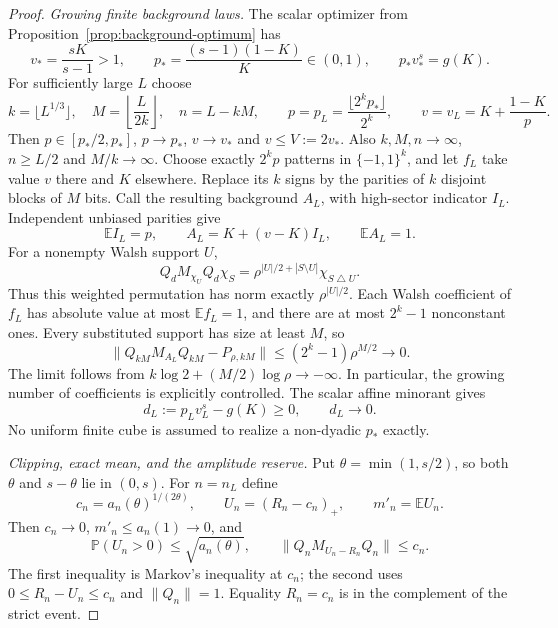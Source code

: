 \documentclass[11pt]{article}
\begin{document}
\begin{proof}
\emph{Growing finite background laws.}
The scalar optimizer from Proposition~\ref{prop:background-optimum} has
\[
 v_*=\frac{sK}{s-1}>1,\qquad
 p_*=\frac{(s-1)(1-K)}K\in(0,1),\qquad p_*v_*^s=g(K).
\]
For sufficiently large $L$ choose
\[
 k=\lfloor L^{1/3}\rfloor,\quad
 M=\left\lfloor\frac{L}{2k}\right\rfloor,\quad n=L-kM,
 \qquad p=p_L=\frac{\lfloor2^kp_*\rfloor}{2^k},
 \qquad v=v_L=K+\frac{1-K}{p}.
\]
Then $p\in[p_*/2,p_*]$, $p\to p_*$, $v\to v_*$ and
$v\le V:=2v_*$. Also $k,M,n\to\infty$, $n\ge L/2$ and
$M/k\to\infty$. Choose exactly $2^kp$ patterns in $\{-1,1\}^k$,
and let $f_L$ take value $v$ there and $K$ elsewhere.
Replace its $k$ signs by the parities of $k$ disjoint blocks of $M$
bits. Call the resulting background $A_L$, with high-sector indicator
$I_L$. Independent unbiased parities give
\[
 \mathbb EI_L=p,\qquad A_L=K+(v-K)I_L,\qquad\mathbb EA_L=1.
\]
For a nonempty Walsh support $U$,
\[
 Q_dM_{\chi_U}Q_d\chi_S
 =\rho^{|U|/2+|S\setminus U|}\chi_{S\mathbin\triangle U}.
\]
Thus this weighted permutation has norm exactly $\rho^{|U|/2}$.
Each Walsh coefficient of $f_L$ has absolute value at most
$\mathbb E f_L=1$, and there are at most $2^k-1$ nonconstant ones.
Every substituted support has size at least $M$, so
\begin{equation}\label{eq:attained-parity}
 \|Q_{kM}M_{A_L}Q_{kM}-P_{\rho,kM}\|
 \le(2^k-1)\rho^{M/2}\longrightarrow0.
\end{equation}
The limit follows from $k\log2+(M/2)\log\rho\to-\infty$.
In particular, the growing number of coefficients is explicitly
controlled. The scalar affine minorant gives
\begin{equation}\label{eq:attained-dyadic-excess}
 d_L:=p_Lv_L^s-g(K)\ge0,\qquad d_L\to0.
\end{equation}
No uniform finite cube is assumed to realize a non-dyadic $p_*$ exactly.

\emph{Clipping, exact mean, and the amplitude reserve.}
Put $\theta=\min(1,s/2)$, so both $\theta$ and $s-\theta$ lie in $(0,s)$.
For $n=n_L$ define
\[
 c_n=a_n(\theta)^{1/(2\theta)},\qquad
 U_n=(R_n-c_n)_+,\qquad m'_n=\mathbb EU_n.
\]
Then $c_n\to0$, $m'_n\le a_n(1)\to0$, and
\begin{equation}\label{eq:attained-clipping}
 \mathbb P(U_n>0)\le\sqrt{a_n(\theta)},\qquad
 \|Q_nM_{U_n-R_n}Q_n\|\le c_n.
\end{equation}
The first inequality is Markov's inequality at $c_n$; the second uses
$0\le R_n-U_n\le c_n$ and $\|Q_n\|=1$.
Equality $R_n=c_n$ is in the complement of the strict event.


\end{proof}
\end{document}
